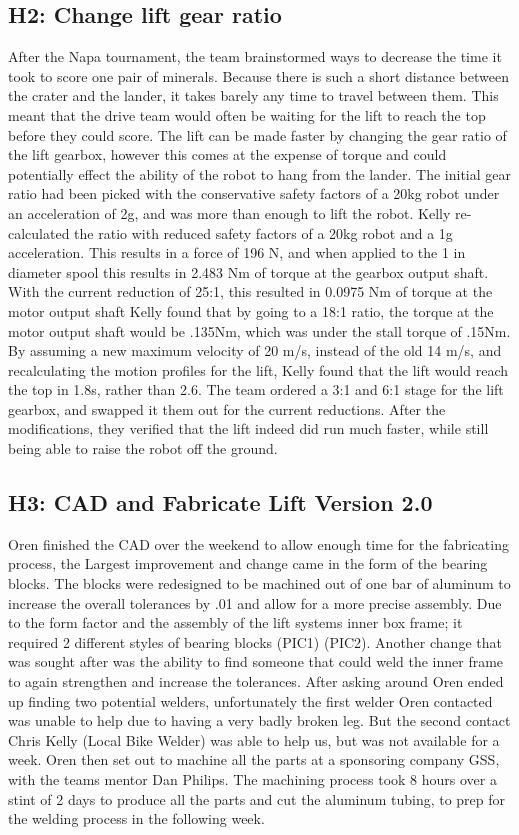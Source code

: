 \documentclass{article}
\begin{document}
\subsection{H2: Change lift gear ratio}

After the Napa tournament, the team brainstormed ways to decrease the time it took to score one pair of minerals. 
Because there is such a short distance between the crater and the lander, it takes barely any time to travel between them. 
This meant that the drive team would often be waiting for the lift to reach the top before they could score.
The lift can be made faster by changing the gear ratio of the lift gearbox, however this comes at the expense of torque and could potentially effect the ability of the robot to hang from the lander.
The initial gear ratio had been picked with the conservative safety factors of a 20kg robot under an acceleration of 2g, and was more than enough to lift the robot. 
Kelly re-calculated the ratio with reduced safety factors of a 20kg robot and a 1g acceleration. 
This results in a force of 196 N, and when applied to the 1 in diameter spool this results in 2.483 Nm of torque at the gearbox output shaft.
With the current reduction of 25:1, this resulted in 0.0975 Nm of torque at the motor output shaft
Kelly found that by going to a 18:1 ratio, the torque at the motor output shaft would be .135Nm, which was under the stall torque of .15Nm.
By assuming a new maximum velocity of 20 m/s, instead of the old 14 m/s, and recalculating the motion profiles for the lift, Kelly found that the lift would reach the top in 1.8s, rather than 2.6.
The team ordered a 3:1 and 6:1 stage for the lift gearbox, and swapped it them out for the current reductions.
After the modifications, they verified that the lift indeed did run much faster, while still being able to raise the robot off the ground. 


\subsection{H3: CAD and Fabricate Lift Version 2.0}

Oren finished the CAD over the weekend to allow enough time for the fabricating process, the Largest improvement and change came in the form of the bearing blocks. The blocks were redesigned to be machined out of one bar of aluminum to increase the overall tolerances by .01 and allow for a more precise assembly. Due to the form factor and the assembly of the lift systems inner box frame; it required 2 different styles of bearing blocks (PIC1) (PIC2). Another change that was sought after was the ability to find someone that could weld the inner frame to again strengthen and increase the tolerances. After asking around Oren ended up finding two potential welders, unfortunately the first welder Oren contacted was unable to help due to having a very badly broken leg. But the second contact Chris Kelly (Local Bike Welder) was able to help us, but was not available for a week. Oren then set out to machine all the parts at a sponsoring company GSS, with the teams mentor Dan Philips. The machining process took 8 hours over a stint of 2 days to produce all the parts and cut the aluminum tubing, to prep for the welding process in the following week. 
\end{document}
